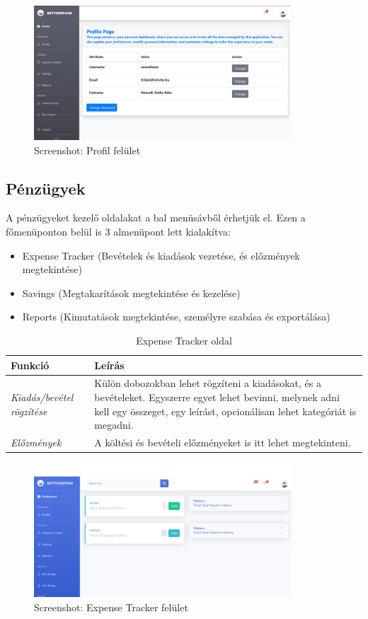 \begin{figure}[H]
	\centering
	\includegraphics[height=190px]{img/profile}
	\caption{Screenshot: Profil felület}
	\label{fig:profile}
\end{figure}

\subsection{Pénzügyek}
A pénzügyeket kezelő oldalakat a bal menüsávből érhetjük el. Ezen a főmenüponton belül is 3 almenüpont lett kialakítva: 
\begin{itemize}
	\item Expense Tracker (Bevételek és kiadások vezetése, és előzmények megtekintése)
	\item Savings (Megtakarítások megtekintése és kezelése)
	\item Reports (Kimutatások megtekintése, személyre szabása és exportálása)
\end{itemize}

\begin{table}[H]
	\centering
	\begin{tabular}{ | m{} | m{} | }
		\hline
		\textbf{Funkció} & \textbf{Leírás} \\
		\hline \hline
		\emph{Kiadás/bevétel rögzítése} & Külön dobozokban lehet rögzíteni a kiadásokat, és a bevételeket. Egyszerre egyet lehet bevinni, melynek adni kell egy összeget, egy leírást, opcionálisan lehet kategóriát is megadni. \\
		\hline
		\emph{Előzmények} &  A költési és bevételi előzményeket is itt lehet megtekinteni.  \\
		\hline
	\end{tabular}
	\caption{Expense Tracker oldal}
	\label{tab:expense-tracker}
\end{table}

\begin{figure}[H]
	\centering
	\includegraphics[height=190px]{img/expense-tracker-screenshot}
	\caption{Screenshot: Expense Tracker felület}
	\label{fig:expense-tracker}
\end{figure}

